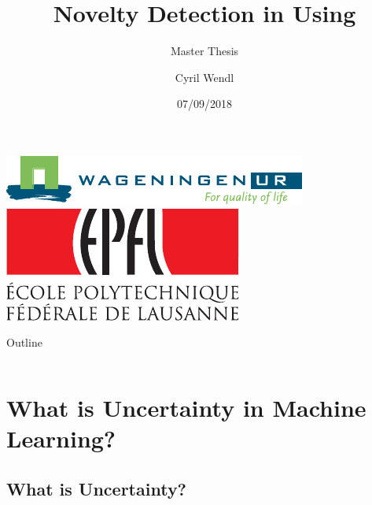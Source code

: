 \documentclass{beamer}
\title[Novelty Detection in CNNs]{Novelty Detection in \acrlongpl{CNN} Using \acrlongpl{DF}
}
\subtitle{Master Thesis}
\author{Cyril Wendl}
\institute[EPFL] 
{
	Environmental Sciences and Engineering\\
	EPFL
}
\date[07/09/2018]{07/09/2018}
\begin{document}
	
	\begin{frame}
	\centering\includegraphics[height=.6cm]{logo_wur_quality_of_life}\hspace{.5cm}\includegraphics[height=.6cm]{logo}
	\titlepage
\end{frame}
\begin{frame}{Outline}
\begin{columns}[t]
	\begin{column}{.5\textwidth}
		\tableofcontents[sections={1-2}]
	\end{column}
	\begin{column}{.5\textwidth}
		\tableofcontents[sections={3-5}]
	\end{column}
\end{columns}
\end{frame}



\section{What is Uncertainty in Machine Learning?}
\subsection{What is Uncertainty?}
\end{document}
